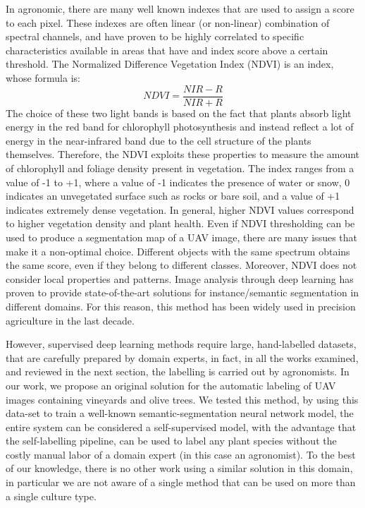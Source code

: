 \documentclass[comsoc,final]{IEEEtran}
\newcommand{\todo}[1]{\textcolor{red}{#1}}
\begin{document}
In agronomic, there are many well known indexes that are used to assign a score to each pixel. These indexes are often linear (or non-linear) combination of spectral channels, and have proven to be highly correlated to specific characteristics available in areas that have and index score above a certain threshold. The Normalized Difference Vegetation Index (NDVI) is an index, whose formula is:
    \[
    NDVI = \frac{NIR-R}{NIR+R}
    \]
    The choice of these two light bands is based on the fact that plants absorb light energy in the red band for chlorophyll photosynthesis and instead reflect a lot of energy in the near-infrared band due to the cell structure of the plants themselves. Therefore, the NDVI exploits these properties to measure the amount of chlorophyll and foliage density present in vegetation.
The index ranges from a value of -1 to +1, where a value of -1 indicates the presence of water or snow, 0 indicates an unvegetated surface such as rocks or bare soil, and a value of +1 indicates extremely dense vegetation. In general, higher NDVI values correspond to higher vegetation density and plant health.
Even if NDVI thresholding can be used to produce a segmentation map of a UAV image, there are many issues that make it a non-optimal choice. Different objects with the same spectrum obtains the same score, even if they belong to different classes. Moreover, NDVI does not consider local properties and patterns. Image analysis through deep learning has proven to provide state-of-the-art solutions for instance/semantic segmentation in different domains. For this reason, this method has been widely used in precision agriculture in the last decade.

However, supervised deep learning methods require large, hand-labelled datasets, that are carefully prepared by domain experts, in fact, in all the works examined, and reviewed in the next section, the labelling is carried out by agronomists. In our work, we propose an original solution for the automatic labeling of UAV images containing vineyards and olive trees. We tested this method, by using this data-set to train a well-known semantic-segmentation neural network model, the entire system can be considered a self-supervised model, with the advantage that the self-labelling pipeline, can be used to label any plant species without the costly manual labor of a domain expert (in this case an agronomist). To the best of our knowledge, there is no other work using a similar solution in this domain, in particular we are not aware of a single method that can be used on more than a single culture type. 
\end{document}
